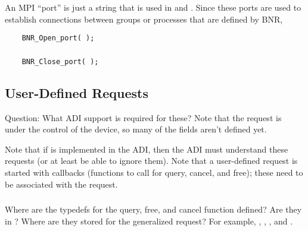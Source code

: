 \documentclass{article}
\begin{document}
\subsubsection{}
An MPI ``port'' is just a string that is used in  and
.  Since these ports are used to establish
connections between groups or processes that are defined by BNR, 

\begin{verbatim}
    BNR_Open_port( );
\end{verbatim}

\subsubsection{}
\begin{verbatim}
    BNR_Close_port( );
\end{verbatim}

\subsection{User-Defined Requests}
\label{sec:grequest}

Question:  What ADI support is required for these?  Note that the
request is under the control of the device, so many of the fields
aren't defined yet.

Note that if  is implemented in the ADI, then the
ADI must understand these requests (or at least be able to ignore
them).
Note that a user-defined request is started with callbacks (functions
to call for query, cancel, and free); these need to be associated with
the request.  

\subsubsection{}
Where are the typedefs for the query, free, and cancel function defined? 
Are they in ?  Where are they stored for the generalized request?
For example, ,
,
, and
. 

\subsubsection{}
\end{document}
